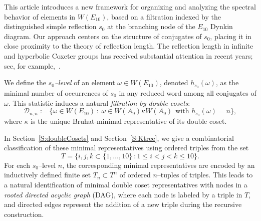 \documentclass[11pt]{amsart}
\numberwithin{equation}{section}
\begin{document}
\medskip
This article introduces a new framework for organizing and analyzing the spectral behavior of elements in $W(E_{10})$, based on a filtration indexed by the distinguished simple reflection $s_0$ at the branching node of the $E_{10}$ Dynkin diagram. Our approach centers on the structure of conjugates of $s_0$, placing it in close proximity to the theory of reflection length. The reflection length in infinite and hyperbolic Coxeter groups has received substantial attention in recent years; see, for example,~\cite{McCammond-Petersen:2011,Duszenko:2012,Drake-Peters:2021,Lotz:2025}.

%
%
%

\medskip
We define the \emph{$s_0$--level} of an element $\omega \in W(E_{10})$, denoted $h_{s_0}(\omega)$, as the minimal number of occurrences of $s_0$ in any reduced word among all conjugates of $\omega$. This statistic induces a natural \emph{filtration by double cosets}:
\[ \mathcal{D}_{n,n} := \{ \omega \in W(E_{10})\ :\  \omega \in W(A_9) \kappa W(A_9)\ \ \text{with } h_{s_0}(\omega) =n\},\] where $\kappa$ is the unique Bruhat-minimal representative of its double coset.

In Section~\ref{S:doubleCosets} and Section~\ref{S:Ktree}, we give a combinatorial classification of these minimal representatives using ordered triples from the set \[T =\{ {i,j,k} \subset \{1,\dots, 10\} \ : 1 \le i<j<k \le 10\}. \] For each $s_0$--level $n$, the corresponding minimal representatives are encoded by an inductively defined finite set $T_n \subset T^n$ of ordered $n$--tuples of triples. This leads to a natural identification of minimal double coset representatives with nodes in a \emph{rooted directed acyclic graph} (DAG), where each node is labeled by a triple in $T$, and directed edges represent the addition of a new triple during the recursive construction.
\end{document}

